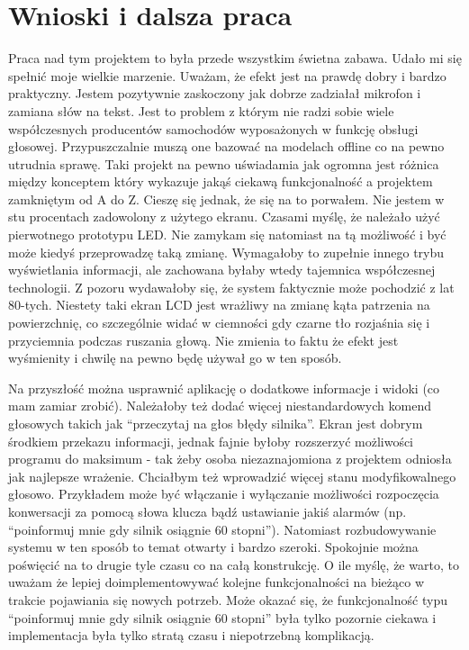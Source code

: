 \documentclass[declaration,shortabstract, inz]{iithesis}
\begin{document}
\chapter{Wnioski i dalsza praca}
    Praca nad tym projektem to była przede wszystkim świetna zabawa. Udało mi się spełnić moje wielkie marzenie. Uważam, że efekt jest na prawdę dobry i bardzo praktyczny. Jestem pozytywnie zaskoczony jak dobrze zadziałał mikrofon i zamiana słów na tekst. Jest to problem z którym nie radzi sobie wiele współczesnych producentów samochodów wyposażonych w funkcję obsługi głosowej. Przypuszczalnie muszą one bazować na modelach offline co na pewno utrudnia sprawę. Taki projekt na pewno uświadamia jak ogromna jest różnica między konceptem który wykazuje jakąś ciekawą funkcjonalność a projektem zamkniętym od A do Z. Cieszę się jednak, że się na to porwałem. Nie jestem w stu procentach zadowolony z użytego ekranu. Czasami myślę, że należało użyć pierwotnego prototypu LED. Nie zamykam się natomiast na tą możliwość i być może kiedyś przeprowadzę taką zmianę. Wymagałoby to zupełnie innego trybu wyświetlania informacji, ale zachowana byłaby wtedy tajemnica współczesnej technologii. Z pozoru wydawałoby się, że system faktycznie może pochodzić z lat 80-tych. Niestety taki ekran LCD jest wrażliwy na zmianę kąta patrzenia na powierzchnię, co szczególnie widać w ciemności gdy czarne tło rozjaśnia się i przyciemnia podczas ruszania głową. Nie zmienia to faktu że efekt jest wyśmienity i chwilę na pewno będę używał go w ten sposób.
    
    Na przyszłość można usprawnić aplikację o dodatkowe informacje i widoki (co mam zamiar zrobić). Należałoby też dodać więcej niestandardowych komend głosowych takich jak ``przeczytaj na głos błędy silnika''. Ekran jest dobrym środkiem przekazu informacji, jednak fajnie byłoby rozszerzyć możliwości programu do maksimum - tak żeby osoba niezaznajomiona z projektem odniosła jak najlepsze wrażenie. Chciałbym też wprowadzić więcej stanu modyfikowalnego głosowo. Przykładem może być włączanie i wyłączanie możliwości rozpoczęcia konwersacji za pomocą słowa klucza bądź ustawianie jakiś alarmów (np. ``poinformuj mnie gdy silnik osiągnie 60 stopni''). Natomiast rozbudowywanie systemu w ten sposób to temat otwarty i bardzo szeroki. Spokojnie można poświęcić na to drugie tyle czasu co na całą konstrukcję. O ile myślę, że warto, to uważam że lepiej doimplementowywać kolejne funkcjonalności na bieżąco w trakcie pojawiania się nowych potrzeb. Może okazać się, że funkcjonalność typu ``poinformuj mnie gdy silnik osiągnie 60 stopni'' była tylko pozornie ciekawa i implementacja była tylko stratą czasu i niepotrzebną komplikacją.
    
\end{document}
